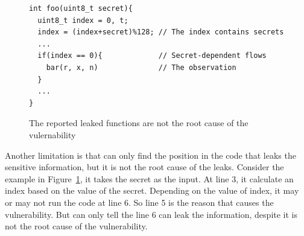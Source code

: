 \begin{figure}
  \centering
  \begin{lstlisting}[xleftmargin=.2\textwidth, xrightmargin=.2\textwidth]
int foo(uint8_t secret){
  uint8_t index = 0, t;
  index = (index+secret)%128; // The index contains secrets
  ...
  if(index == 0){             // Secret-dependent flows
    bar(r, x, n)              // The observation
  }
  ...
}
\end{lstlisting}
  \caption{The reported leaked functions are not the root cause of the vulernability}
  \label{fig:limitation}
\end{figure}


Another limitation is that \ctool{} can only find the position in the code that leaks the sensitive information, but it is not the root cause of the leaks. Consider the example in Figure~\ref{fig:limitation}, it takes the secret as the input. At line 3, it calculate an index based on the value of the secret. Depending on the value of index, it may or may not run the code at line 6. So line 5 is the reason that causes the vulnerability. But \ctool{} can only tell the line 6 can leak the information, despite it is not the root cause of the vulnerability.


